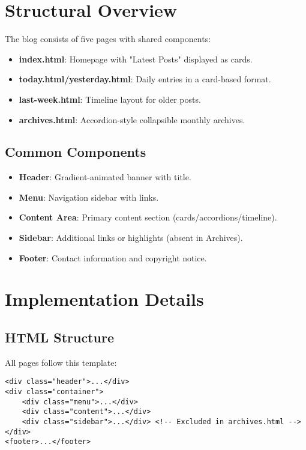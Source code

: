 \documentclass[a4paper,12pt]{article}
\begin{document}
\section{Structural Overview}
The blog consists of five pages with shared components:
\begin{itemize}
    \item \textbf{index.html}: Homepage with "Latest Posts" displayed as cards.
    \item \textbf{today.html/yesterday.html}: Daily entries in a card-based format.
    \item \textbf{last-week.html}: Timeline layout for older posts.
    \item \textbf{archives.html}: Accordion-style collapsible monthly archives.
\end{itemize}
\subsection{Common Components}
\begin{itemize}
    \item \textbf{Header}: Gradient-animated banner with title.
    \item \textbf{Menu}: Navigation sidebar with links.
    \item \textbf{Content Area}: Primary content section (cards/accordions/timeline).
    \item \textbf{Sidebar}: Additional links or highlights (absent in Archives).
    \item \textbf{Footer}: Contact information and copyright notice.
\end{itemize}

\section{Implementation Details}
\subsection{HTML Structure}
All pages follow this template:
\begin{verbatim}
<div class="header">...</div>
<div class="container">
    <div class="menu">...</div>
    <div class="content">...</div>
    <div class="sidebar">...</div> <!-- Excluded in archives.html -->
</div>
<footer>...</footer>
\end{verbatim}
\end{document}

